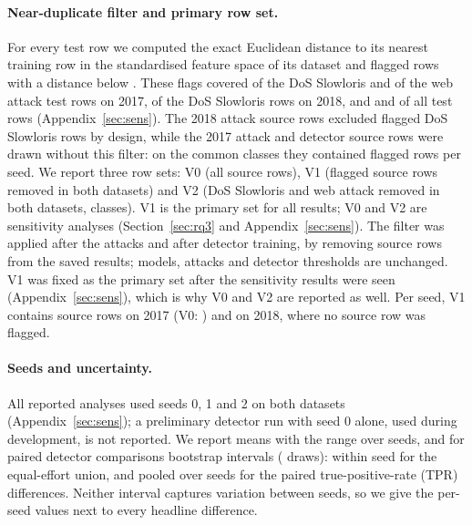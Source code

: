 \paragraph{Near-duplicate filter and primary row set.}
For every test row we computed the exact Euclidean distance to its nearest training row in the standardised feature
space of its dataset and flagged rows with a distance below \paramNDThr.
These flags covered \ndSlowlorisSeventeen{} of the DoS Slowloris and \ndWebSeventeen{} of the web attack test rows on
2017, \ndSlowlorisEighteen{} of the DoS Slowloris rows on 2018, and \ndAllSeventeen{} and \ndAllEighteen{} of all test
rows (Appendix~\ref{sec:sens}).
The 2018 attack source rows excluded flagged DoS Slowloris rows by design, while the 2017 attack and detector source
rows were drawn without this filter: on the \nCommonClasses{} common classes they contained \ndSrcCommonSeventeen{}
flagged rows per seed.
We report three row sets: V0 (all source rows), V1 (flagged source rows removed in both datasets) and V2
(DoS Slowloris and web attack removed in both datasets, \nVtwoClasses{} classes).
V1 is the primary set for all results; V0 and V2 are sensitivity analyses (Section~\ref{sec:rq3} and
Appendix~\ref{sec:sens}).
The filter was applied after the attacks and after detector training, by removing source rows from the saved results;
models, attacks and detector thresholds are unchanged.
V1 was fixed as the primary set after the sensitivity results were seen (Appendix~\ref{sec:sens}), which is why V0 and
V2 are reported as well.
Per seed, V1 contains \nSrcVoneSeventeen{} source rows on 2017 (V0: \nSrcVzeroSeventeen) and \nSrcVoneEighteen{} on
2018, where no source row was flagged.

\paragraph{Seeds and uncertainty.}
All reported analyses used seeds 0, 1 and 2 on both datasets (Appendix~\ref{sec:sens}); a preliminary
detector run with seed 0 alone, used during development, is not reported.
We report means with the range over seeds, and for paired detector comparisons \paramCILevel{} bootstrap intervals
(\paramBoot{} draws): within seed for the equal-effort union, and pooled over seeds for the paired true-positive-rate
(TPR) differences.
Neither interval captures variation between seeds, so we give the per-seed values next to every headline difference.
